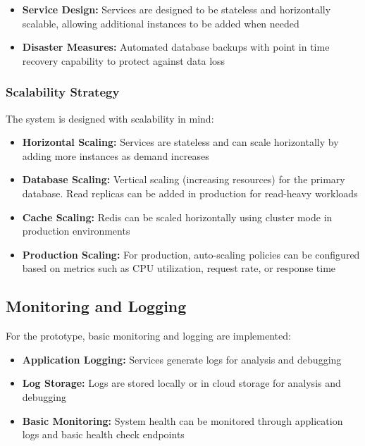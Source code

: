 \begin{itemize}
    \item \textbf{Service Design:} Services are designed to be stateless and horizontally scalable, allowing additional instances to be added when needed
    \item \textbf{Disaster Measures:} Automated database backups with point in time recovery capability to protect against data loss
\end{itemize}

\subsubsection{Scalability Strategy}
The system is designed with scalability in mind:

\begin{itemize}
    \item \textbf{Horizontal Scaling:} Services are stateless and can scale horizontally by adding more instances as demand increases
    \item \textbf{Database Scaling:} Vertical scaling (increasing resources) for the primary database. Read replicas can be added in production for read-heavy workloads
    \item \textbf{Cache Scaling:} Redis can be scaled horizontally using cluster mode in production environments
    \item \textbf{Production Scaling:} For production, auto-scaling policies can be configured based on metrics such as CPU utilization, request rate, or response time
\end{itemize}

\subsection{Monitoring and Logging}

For the prototype, basic monitoring and logging are implemented:

\begin{itemize}
    \item \textbf{Application Logging:} Services generate logs for analysis and debugging
    \item \textbf{Log Storage:} Logs are stored locally or in cloud storage for analysis and debugging
    \item \textbf{Basic Monitoring:} System health can be monitored through application logs and basic health check endpoints
\end{itemize}

